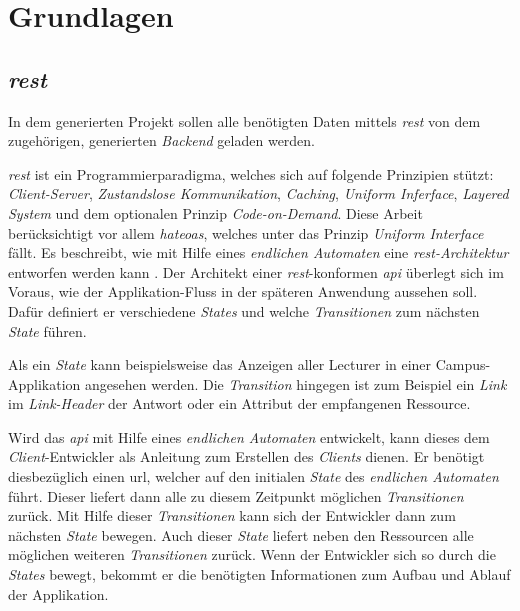 \chapter{Grundlagen}\label{ch:basics}
\section{\textit{\acf{rest}}}\label{sec:rest}
In dem generierten Projekt sollen alle benötigten Daten mittels \textit{\ac{rest}} von dem zugehörigen, generierten \textit{Backend} geladen werden. 

 \textit{\ac{rest}} \cite{rest_fielding} ist ein Programmierparadigma, welches sich auf folgende Prinzipien stützt: \textit{Client-Server}, \textit{Zustandslose Kommunikation}, \textit{Caching}, \textit{Uniform Inferface}, \textit{Layered System} und dem optionalen Prinzip \textit{Code-on-Demand}.
Diese Arbeit berücksichtigt vor allem \textit{\acf{hateoas}}, welches unter das Prinzip \textit{Uniform Interface} fällt. Es beschreibt, wie mit Hilfe eines \textit{endlichen Automaten} eine \textit{\ac{rest}-Architektur} entworfen werden kann \cite{hypermedia}.
Der Architekt einer \textit{\ac{rest}}-konformen \textit{\acf{api}} überlegt sich im Voraus, wie der Applikation-Fluss in der späteren Anwendung aussehen soll. Dafür definiert er verschiedene \textit{States} und welche \textit{Transitionen} zum nächsten \textit{State} führen.

Als ein \textit{State} kann beispielsweise das Anzeigen aller Lecturer in einer Campus-Applikation angesehen werden.
Die \textit{Transition} hingegen ist zum Beispiel ein \textit{Link} im \textit{Link-Header} der Antwort oder ein Attribut der empfangenen Ressource. 

Wird das \textit{\ac{api}} mit Hilfe eines \textit{endlichen Automaten} entwickelt, kann dieses dem \textit{Client}-Entwickler als Anleitung zum Erstellen des \textit{Clients} dienen. Er benötigt diesbezüglich einen \acf{url}, welcher auf den initialen \textit{State} des \textit{endlichen Automaten} führt. Dieser liefert dann alle zu diesem Zeitpunkt möglichen \textit{Transitionen} zurück. Mit Hilfe dieser \textit{Transitionen} kann sich der Entwickler dann zum nächsten \textit{State} bewegen. Auch dieser \textit{State} liefert neben den Ressourcen alle möglichen weiteren \textit{Transitionen} zurück. 
Wenn der Entwickler sich so durch die \textit{States} bewegt, bekommt er die benötigten Informationen zum Aufbau und Ablauf der Applikation.

